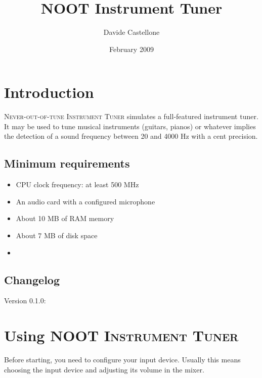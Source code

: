 \newcommand{\noun}[1]{\textsc{#1}}

\makeindex


\author{Davide Castellone}
\title{NOOT Instrument Tuner}
\date{February 2009}
\maketitle
\tableofcontents

\pagestyle{fancyplain}%

\chapter{Introduction}\label{introduction}

\noun{Never-out-of-tune Instrument Tuner} simulates a full-featured instrument tuner. It may
be used to tune musical instruments (guitars, pianos) or whatever
implies the detection of a sound frequency between 20 and 4000 Hz with a cent precision.

\section{Minimum requirements}\label{requirements}

\begin{itemize}
\item CPU clock frequency: at least 500 MHz
\item An audio card with a configured microphone
\item About 10 MB of RAM memory
\item About 7 MB of disk space
\item
\end{itemize}

\section{Changelog}\label{changelog}

Version 0.1.0:


\chapter{Using \noun{NOOT Instrument Tuner}}\label{gettingstarted}

Before starting, you need to configure your input device.
Usually this means choosing the input device and adjusting
its volume in the mixer.

